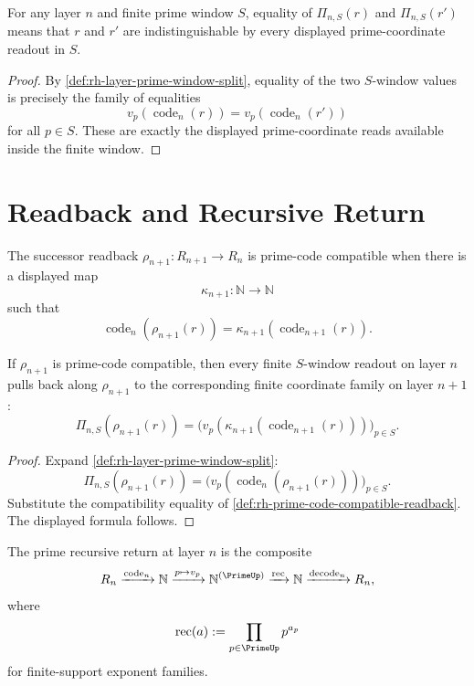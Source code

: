 \begin{theorem}
\label{thm:rh-finite-windows-layer-quotients}
For any layer $n$ and finite prime window $S$, equality of
$\Pi_{n,S}(r)$ and $\Pi_{n,S}(r')$ means that $r$ and $r'$ are
indistinguishable by every displayed prime-coordinate readout in $S$.
\end{theorem}

\begin{proof}
By \autoref{def:rh-layer-prime-window-split}, equality of the two
$S$-window values is precisely the family of equalities
$$
v_p(\operatorname{code}_n(r))
=
v_p(\operatorname{code}_n(r'))
$$
for all $p\in S$. These are exactly the displayed prime-coordinate reads
available inside the finite window.
\end{proof}

\section{Readback and Recursive Return}
\label{sec:rh-prime-window-readback-recursive-return}

\begin{definition}
\label{def:rh-prime-code-compatible-readback}
The successor readback $\rho_{n+1}:R_{n+1}\to R_n$ is prime-code
compatible when there is a displayed map
$$
\kappa_{n+1}:\mathbb N\to\mathbb N
$$
such that
$$
\operatorname{code}_n(\rho_{n+1}(r))
=
\kappa_{n+1}(\operatorname{code}_{n+1}(r)).
$$
\end{definition}

\begin{theorem}
\label{thm:rh-prime-window-inheritance}
If $\rho_{n+1}$ is prime-code compatible, then every finite
$S$-window readout on layer $n$ pulls back along $\rho_{n+1}$ to the
corresponding finite coordinate family on layer $n+1$:
$$
\Pi_{n,S}(\rho_{n+1}(r))
=
\bigl(v_p(\kappa_{n+1}(\operatorname{code}_{n+1}(r)))\bigr)_{p\in S}.
$$
\end{theorem}

\begin{proof}
Expand \autoref{def:rh-layer-prime-window-split}:
$$
\Pi_{n,S}(\rho_{n+1}(r))
=
\bigl(v_p(\operatorname{code}_n(\rho_{n+1}(r)))\bigr)_{p\in S}.
$$
Substitute the compatibility equality of
\autoref{def:rh-prime-code-compatible-readback}. The displayed formula
follows.
\end{proof}

\begin{definition}
\label{def:rh-prime-recursive-return}
The prime recursive return at layer $n$ is the composite
$$
R_n
\xrightarrow{\operatorname{code}_n}
\mathbb N
\xrightarrow{p\mapsto v_p}
\mathbb N^{(\PrimeUp)}
\xrightarrow{\operatorname{rec}}
\mathbb N
\xrightarrow{\operatorname{decode}_n}
R_n,
$$
where
$$
\operatorname{rec}(a):=\prod_{p\in\PrimeUp}p^{a_p}
$$
for finite-support exponent families.
\end{definition}

